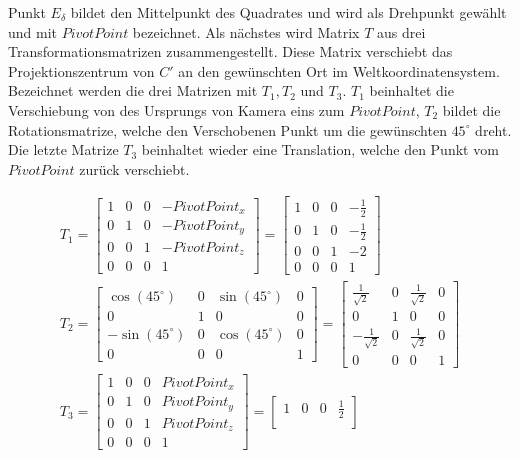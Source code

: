 Punkt $E_\delta$ bildet den Mittelpunkt des Quadrates und wird als Drehpunkt gewählt und mit $\textit{PivotPoint}$ bezeichnet. Als nächstes wird Matrix $T$ aus drei Transformationsmatrizen zusammengestellt. Diese Matrix verschiebt das Projektionszentrum von $C'$ an den gewünschten Ort im Weltkoordinatensystem. Bezeichnet werden die drei Matrizen mit $T_1, T_2$ und $T_3$. $T_1$ beinhaltet die Verschiebung von des Ursprungs von Kamera eins zum $\textit{PivotPoint}$, $T_2$ bildet die Rotationsmatrize, welche den Verschobenen Punkt um die gewünschten $45^\circ$ dreht. Die letzte Matrize $T_3$ beinhaltet wieder eine Translation, welche den Punkt vom $\textit{PivotPoint}$ zurück verschiebt. 

\begin{gather}
	T_1 = \begin{bmatrix}
	1&0&0&-\textit{PivotPoint}_x\\
	0&1&0&-\textit{PivotPoint}_y\\
	0&0&1&-\textit{PivotPoint}_z\\
	0&0&0&1
	\end{bmatrix} = 
	\begin{bmatrix}
	1&0&0&-\frac{1}{2}\\
	0&1&0&-\frac{1}{2}\\
	0&0&1&-2\\
	0&0&0&1
	\end{bmatrix}\\
	T_2 = \begin{bmatrix}
	\cos(45^\circ)&0&\sin(45^\circ)&0\\
	0&1&0&0\\
	-\sin(45^\circ)&0&\cos(45^\circ)&0\\
	0&0&0&1
	\end{bmatrix}=
	\begin{bmatrix}
	\frac{1}{\sqrt{2}}&0&\frac{1}{\sqrt{2}}&0\\
	0&1&0&0\\
	-\frac{1}{\sqrt{2}}&0&\frac{1}{\sqrt{2}}&0\\
	0&0&0&1
	\end{bmatrix}\\
	T_3 = 
	\begin{bmatrix}
	1&0&0&\textit{PivotPoint}_x\\
	0&1&0&\textit{PivotPoint}_y\\
	0&0&1&\textit{PivotPoint}_z\\
	0&0&0&1
	\end{bmatrix} = 
	\begin{bmatrix}
	1&0&0&\frac{1}{2}\\

\end{bmatrix}
\end{gather}
